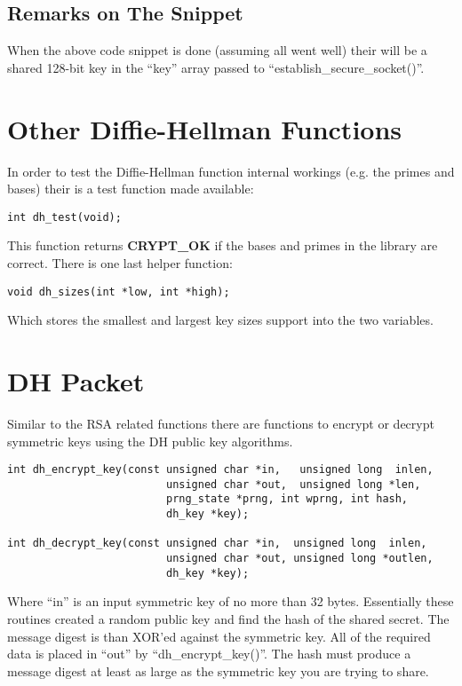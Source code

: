 \documentclass[synpaper]{book}
\begin{document}
\subsection{Remarks on The Snippet}
When the above code snippet is done (assuming all went well) their will be a shared 128-bit key in the ``key'' array
passed to ``establish\_secure\_socket()''.

\section{Other Diffie-Hellman Functions}
In order to test the Diffie-Hellman function internal workings (e.g. the primes and bases) their is a test function made
available:
\begin{verbatim}
int dh_test(void);
\end{verbatim}

This function returns {\bf CRYPT\_OK} if the bases and primes in the library are correct.  There is one last helper 
function:
\begin{verbatim}
void dh_sizes(int *low, int *high);
\end{verbatim}
Which stores the smallest and largest key sizes support into the two variables.

\section{DH Packet}
Similar to the RSA related functions there are functions to encrypt or decrypt symmetric keys using the DH public key
algorithms.  
 
\begin{verbatim}
int dh_encrypt_key(const unsigned char *in,   unsigned long  inlen,
                         unsigned char *out,  unsigned long *len, 
                         prng_state *prng, int wprng, int hash, 
                         dh_key *key);

int dh_decrypt_key(const unsigned char *in,  unsigned long  inlen,
                         unsigned char *out, unsigned long *outlen, 
                         dh_key *key);
\end{verbatim}
Where ``in'' is an input symmetric key of no more than 32 bytes.  Essentially these routines created a random public key
and find the hash of the shared secret.  The message digest is than XOR'ed against the symmetric key.  All of the 
required data is placed in ``out'' by ``dh\_encrypt\_key()''.   The hash must produce a message digest at least as large
as the symmetric key you are trying to share.
\end{document}

